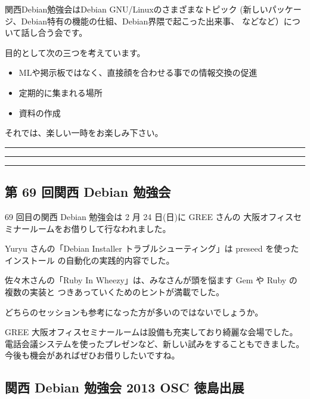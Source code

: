 \documentclass[mingoth,a4paper]{jsarticle}
\begin{document}
 関西Debian勉強会はDebian GNU/Linuxのさまざまなトピック
 (新しいパッケージ、Debian特有の機能の仕組、Debian界隈で起こった出来事、
 などなど）について話し合う会です。

 目的として次の三つを考えています。
 \begin{itemize}
  \item MLや掲示板ではなく、直接顔を合わせる事での情報交換の促進
  \item 定期的に集まれる場所
  \item 資料の作成
 \end{itemize}

 それでは、楽しい一時をお楽しみ下さい。

\newpage

\begin{minipage}[b]{0.2\hsize}
 {}
\end{minipage}
\begin{minipage}[b]{0.8\hsize}
\hrule
\vspace{2mm}
\hrule
\setcounter{tocdepth}{1}
\tableofcontents
\vspace{2mm}
\hrule
\end{minipage}


\subsection{第 69 回関西 Debian 勉強会}

69 回目の関西 Debian 勉強会は 2 月 24 日(日)に GREE さんの
大阪オフィスセミナールームをお借りして行なわれました。

Yuryu さんの「Debian Installer トラブルシューティング」は preseed を使ったインストール
の自動化の実践的内容でした。

佐々木さんの「Ruby In Wheezy」は、みなさんが頭を悩ます Gem や Ruby の複数の実装と
つきあっていくためのヒントが満載でした。

どちらのセッションも参考になった方が多いのではないでしょうか。

GREE 大阪オフィスセミナールームは設備も充実しており綺麗な会場でした。
電話会議システムを使ったプレゼンなど、新しい試みをすることもできました。
今後も機会があればぜひお借りしたいですね。

\subsection{関西 Debian 勉強会 2013 OSC 徳島出展}
\end{document}
